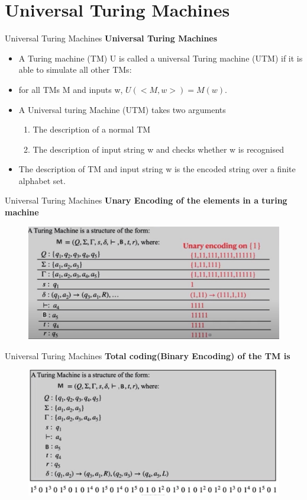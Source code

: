 \documentclass{beamer}
\begin{document}
\section{Universal Turing Machines}
\begin{frame}{Universal Turing Machines}
	\textbf{Universal Turing Machines}
	\begin{itemize}
		\item A Turing machine (TM) U is called a universal Turing machine (UTM) if it is able to simulate
		all other TMs: 
		\item for all TMs M and inputs w, $U(<M, w>) = M(w).$
		\item A Universal turing Machine (UTM) takes two arguments 
		\begin{enumerate}
			\item The description of a normal TM
			\item The description of input string w and checks whether w is recognised
				\end{enumerate} 
		\item  The description of TM and input string w is the encoded string over a finite alphabet set.
	\end{itemize}

\end{frame}
\begin{frame}{Universal Turing Machines}
	\textbf{Unary Encoding of the elements in a turing machine}
	\begin{figure}
	\includegraphics[scale=.6]{img5/m21}
\end{figure}
\end{frame}
\begin{frame}{Universal Turing Machines}
	\textbf{Total coding(Binary Encoding) of the TM is}
	\begin{figure}
		\includegraphics[scale=.55]{img5/m22}
	\end{figure}
\end{frame}
\end{document}

